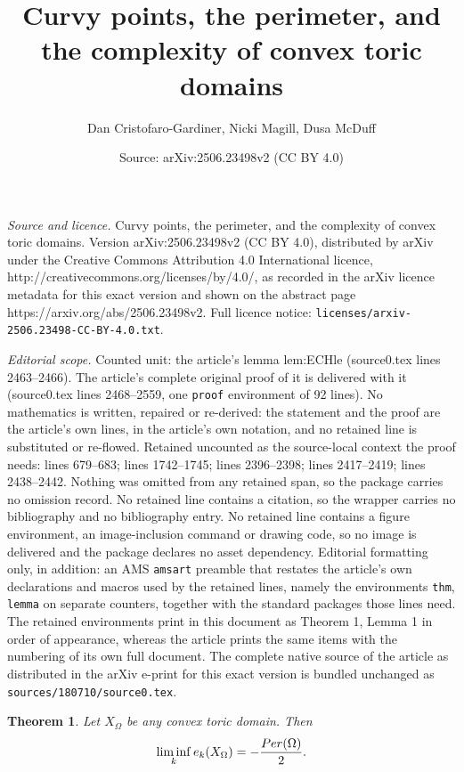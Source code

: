 \documentclass[10pt,a4paper]{amsart}
\title{Curvy points, the perimeter, and the complexity of convex toric domains}
\author{Dan Cristofaro-Gardiner, Nicki Magill, Dusa McDuff}
\date{Source: arXiv:2506.23498v2 (CC BY 4.0)}
\newtheorem{thm}{Theorem}
\newcommand{\Per}{{\rm Per}}
\begin{document}
\maketitle

\noindent\emph{Source and licence.} Curvy points, the perimeter, and the complexity of convex toric domains. Version arXiv:2506.23498v2 (CC BY 4.0), distributed by arXiv under the Creative Commons Attribution 4.0 International licence, http://creativecommons.org/licenses/by/4.0/, as recorded in the arXiv licence metadata for this exact version and shown on the abstract page https://arxiv.org/abs/2506.23498v2. Full licence notice: \texttt{licenses/arxiv-2506.23498-CC-BY-4.0.txt}.\par\smallskip

\noindent\textit{Editorial scope.} Counted unit: the article's lemma lem:ECHle (source0.tex lines 2463--2466). The article's complete original proof of it is delivered with it (source0.tex lines 2468--2559, one \texttt{proof} environment of 92 lines). No mathematics is written, repaired or re-derived: the statement and the proof are the article's own lines, in the article's own notation, and no retained line is substituted or re-flowed.  Retained uncounted as the source-local context the proof needs: lines 679--683; lines 1742--1745; lines 2396--2398; lines 2417--2419; lines 2438--2442.  Nothing was omitted from any retained span, so the package carries no omission record.  No retained line contains a citation, so the wrapper carries no bibliography and no bibliography entry.  No retained line contains a figure environment, an image-inclusion command or drawing code, so no image is delivered and the package declares no asset dependency.  Editorial formatting only, in addition: an AMS \texttt{amsart} preamble that restates the article's own declarations and macros used by the retained lines, namely the environments \texttt{thm}, \texttt{lemma} on separate counters, together with the standard packages those lines need.  The retained environments print in this document as Theorem 1, Lemma 1 in order of appearance, whereas the article prints the same items with the numbering of its own full document.  The complete native source of the article as distributed in the arXiv e-print for this exact version is bundled unchanged as \texttt{sources/180710/source0.tex}.
\begin{thm}
\label{thm:convexper}
Let $X_{\Omega}$ be any convex toric domain.  Then
\[ \liminf_k e_k(X_{\Omega}) = - \frac{\Per(\Omega)}{2}.\]
\end{thm} 
\end{document}
